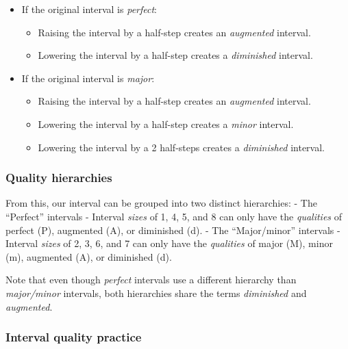 \documentclass{book}
\providecommand{\tightlist}{%
  \setlength{\itemsep}{0pt}\setlength{\parskip}{0pt}}
\begin{document}
\begin{itemize}
\tightlist
\item
  If the original interval is \emph{perfect}:

  \begin{itemize}
  \tightlist
  \item
    Raising the interval by a half-step creates an \emph{augmented} interval.
  \item
    Lowering the interval by a half-step creates a \emph{diminished} interval.
  \end{itemize}
\item
  If the original interval is \emph{major}:

  \begin{itemize}
  \tightlist
  \item
    Raising the interval by a half-step creates an \emph{augmented} interval.
  \item
    Lowering the interval by a half-step creates a \emph{minor} interval.
  \item
    Lowering the interval by a 2 half-steps creates a \emph{diminished}
    interval.
  \end{itemize}
\end{itemize}

\hypertarget{quality-hierarchies}{%
\subsubsection{Quality hierarchies}\label{quality-hierarchies}}

From this, our interval can be grouped into two distinct hierarchies: - The
``Perfect'' intervals - Interval \emph{sizes} of 1, 4, 5, and 8 can only have
the \emph{qualities} of perfect (P), augmented (A), or diminished (d). - The
``Major/minor'' intervals - Interval \emph{sizes} of 2, 3, 6, and 7 can only
have the \emph{qualities} of major (M), minor (m), augmented (A), or
diminished (d).

Note that even though \emph{perfect} intervals use a different hierarchy than
\emph{major/minor} intervals, both hierarchies share the terms
\emph{diminished} and \emph{augmented}.

\hypertarget{interval-quality-practice}{%
\subsubsection{Interval quality practice}\label{interval-quality-practice}}
\end{document}
